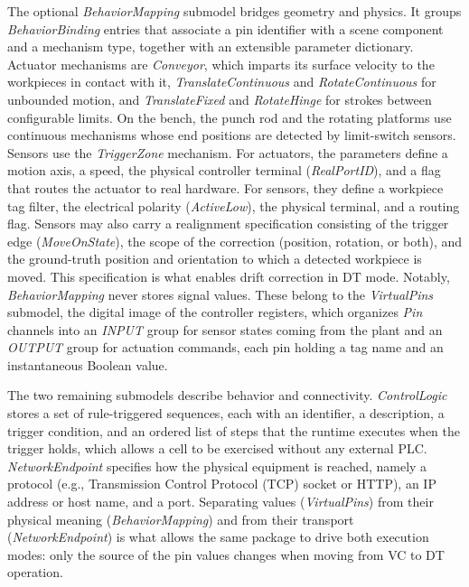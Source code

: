 \documentclass{ieeeojies}
\begin{document}
The optional \textit{BehaviorMapping} submodel bridges geometry and physics. It groups \textit{BehaviorBinding} entries that associate a pin identifier with a scene component and a mechanism type, together with an extensible parameter dictionary. Actuator mechanisms are \textit{Conveyor}, which imparts its surface velocity to the workpieces in contact with it, \textit{TranslateContinuous} and \textit{RotateContinuous} for unbounded motion, and \textit{TranslateFixed} and \textit{RotateHinge} for strokes between configurable limits. On the bench, the punch rod and the rotating platforms use continuous mechanisms whose end positions are detected by limit-switch sensors. Sensors use the \textit{TriggerZone} mechanism. For actuators, the parameters define a motion axis, a speed, the physical controller terminal (\textit{RealPortID}), and a flag that routes the actuator to real hardware. For sensors, they define a workpiece tag filter, the electrical polarity (\textit{ActiveLow}), the physical terminal, and a routing flag. Sensors may also carry a realignment specification consisting of the trigger edge (\textit{MoveOnState}), the scope of the correction (position, rotation, or both), and the ground-truth position and orientation to which a detected workpiece is moved. This specification is what enables drift correction in DT mode. Notably, \textit{BehaviorMapping} never stores signal values. These belong to the \textit{VirtualPins} submodel, the digital image of the controller registers, which organizes \textit{Pin} channels into an \textit{INPUT} group for sensor states coming from the plant and an \textit{OUTPUT} group for actuation commands, each pin holding a tag name and an instantaneous Boolean value.

The two remaining submodels describe behavior and connectivity. \textit{ControlLogic} stores a set of rule-triggered sequences, each with an identifier, a description, a trigger condition, and an ordered list of steps that the runtime executes when the trigger holds, which allows a cell to be exercised without any external PLC. \textit{NetworkEndpoint} specifies how the physical equipment is reached, namely a protocol (e.g., Transmission Control Protocol (TCP) socket or HTTP), an IP address or host name, and a port. Separating values (\textit{VirtualPins}) from their physical meaning (\textit{BehaviorMapping}) and from their transport (\textit{NetworkEndpoint}) is what allows the same package to drive both execution modes: only the source of the pin values changes when moving from VC to DT operation.
\end{document}
